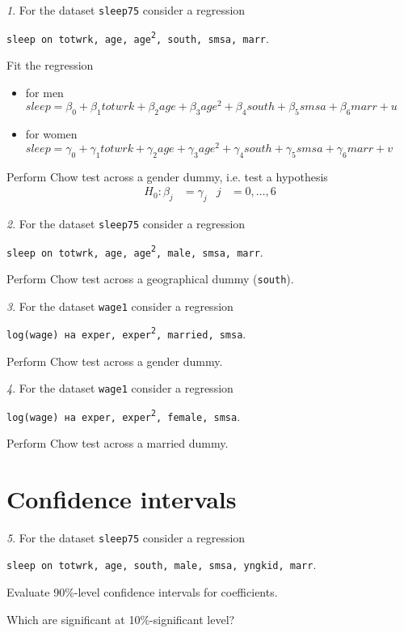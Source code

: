 \documentclass[12pt]{article}
\theoremstyle{remark}
\newtheorem{problem}{}[section]
\begin{document}
\begin{problem}
For the dataset \texttt{sleep75} consider a regression
\begin{center}
	\texttt{sleep on totwrk, age, age\textsuperscript{2}, south, smsa, marr}.
\end{center}
Fit the regression
\begin{itemize}
	\item for men $sleep=\beta_0+\beta_1totwrk+\beta_2age+\beta_3age^2+\beta_4south+\beta_5smsa+\beta_6marr+u$
	\item for women $sleep=\gamma_0+\gamma_1totwrk+\gamma_2age+\gamma_3age^2+\gamma_4south+\gamma_5smsa+\gamma_6marr+v$
\end{itemize}
Perform Chow test across a gender dummy, i.e. test a hypothesis 
\begin{align*}
	H_0:\beta_j&=\gamma_j & j&=0,\ldots,6
\end{align*}
\end{problem}

\begin{problem}
For the dataset \texttt{sleep75} consider a regression
\begin{center}
	\texttt{sleep on totwrk, age, age\textsuperscript{2}, male, smsa, marr}.
\end{center}
Perform Chow test across a geographical dummy (\texttt{south}).
\end{problem}

\begin{problem}
For the dataset \texttt{wage1} consider a regression
\begin{center}
	\texttt{log(wage) на exper, exper\textsuperscript{2}, married, smsa}.
\end{center}
Perform Chow test across a gender dummy.
\end{problem}

\begin{problem}
For the dataset \texttt{wage1} consider a regression
\begin{center}
	\texttt{log(wage) на exper, exper\textsuperscript{2}, female, smsa}.
\end{center}
Perform Chow test across a married dummy.
\end{problem}

\section{Confidence intervals}

\begin{problem}
For the dataset \texttt{sleep75} consider a regression
\begin{center}
	\texttt{sleep on totwrk, age, south, male, smsa, yngkid, marr}.
\end{center}
Evaluate 90\%-level confidence intervals for coefficients.

Which are significant at 10\%-significant level?
\end{problem}
\end{document}
